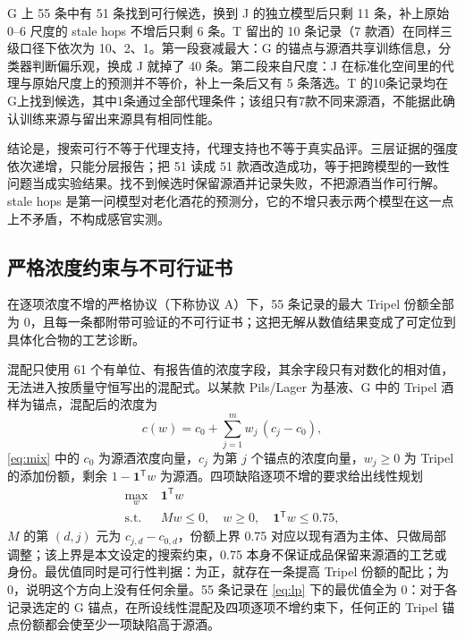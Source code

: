 G 上 55 条中有 51 条找到可行候选，换到 J 的独立模型后只剩 11 条，补上原始 0--6 尺度的 stale hops 不增后只剩 6 条。T 留出的 10 条记录（7 款酒）在同样三级口径下依次为 10、2、1。第一段衰减最大：G 的锚点与源酒共享训练信息，分类器判断偏乐观，换成 J 就掉了 40 条。第二段来自尺度：J 在标准化空间里的代理与原始尺度上的预测并不等价，补上一条后又有 5 条落选。T 的10条记录均在G上找到候选，其中1条通过全部代理条件；该组只有7款不同来源酒，不能据此确认训练来源与留出来源具有相同性能。

结论是，搜索可行不等于代理支持，代理支持也不等于真实品评。三层证据的强度依次递增，只能分层报告；把 51 读成 51 款酒改造成功，等于把跨模型的一致性问题当成实验结果。找不到候选时保留源酒并记录失败，不把源酒当作可行解。stale hops 是第一问模型对老化酒花的预测分，它的不增只表示两个模型在这一点上不矛盾，不构成感官实测。

\subsection{严格浓度约束与不可行证书}

在逐项浓度不增的严格协议（下称协议 A）下，55 条记录的最大 Tripel 份额全部为 0，且每一条都附带可验证的不可行证书；这把无解从数值结果变成了可定位到具体化合物的工艺诊断。

混配只使用 61 个有单位、有报告值的浓度字段，其余字段只有对数化的相对值，无法进入按质量守恒写出的混配式。以某款 Pils/Lager 为基液、G 中的 Tripel 酒样为锚点，混配后的浓度为
\begin{equation}
c(w)=c_{0}+\sum_{j=1}^{m}w_{j}\,(c_{j}-c_{0}),
\label{eq:mix}
\end{equation}
\eqref{eq:mix} 中的 $c_0$ 为源酒浓度向量，$c_j$ 为第 $j$ 个锚点的浓度向量，$w_j\ge 0$ 为 Tripel 的添加份额，剩余 $1-\mathbf{1}^{\mathsf T}w$ 为源酒。四项缺陷逐项不增的要求给出线性规划
\begin{equation}
\begin{aligned}
\max_{w}\ &\mathbf{1}^{\mathsf T}w\\
\mathrm{s.t.}\ \ &Mw\le 0,\quad w\ge 0,\quad \mathbf{1}^{\mathsf T}w\le 0.75,
\end{aligned}
\label{eq:lp}
\end{equation}
$M$ 的第 $(d,j)$ 元为 $c_{j,d}-c_{0,d}$，份额上界 0.75 对应以现有酒为主体、只做局部调整；该上界是本文设定的搜索约束，0.75 本身不保证成品保留来源酒的工艺或身份。最优值同时是可行性判据：为正，就存在一条提高 Tripel 份额的配比；为 0，说明这个方向上没有任何余量。55 条记录在 \eqref{eq:lp} 下的最优值全为 0：对于各记录选定的 G 锚点，在所设线性混配及四项逐项不增约束下，任何正的 Tripel 锚点份额都会使至少一项缺陷高于源酒。

